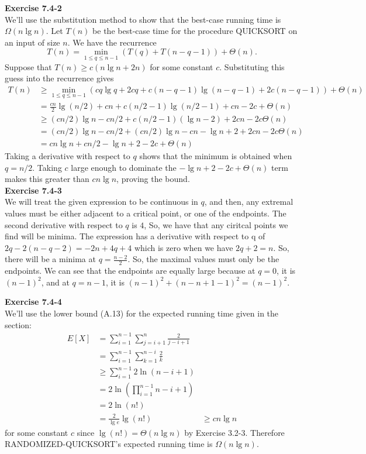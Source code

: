 \documentclass{article}
\begin{document}
\noindent\textbf{Exercise 7.4-2}\\

We'll use the substitution method to show that the best-case running time is $\Omega(n \lg n)$.  Let $T(n)$ be the best-case time for the procedure QUICKSORT on an input of size $n$.  We have the recurrence
\[ T(n) = \min_{1 \leq q \leq n-1} (T(q) + T(n-q-1)) + \Theta(n).\]
Suppose that $T(n) \geq c(n\lg n + 2n)$ for some constant $c$.  Substituting this guess into the recurrence gives
\begin{align*}
T(n) &\geq \min_{1 \leq q \leq n-1} (cq\lg q + 2cq + c(n-q-1)\lg(n-q-1) + 2c(n-q-1)) + \Theta(n) \\
&= \frac{cn}{2}\lg(n/2) + cn + c(n/2 - 1)\lg(n/2 - 1) + cn - 2c+ \Theta(n) \\
&\geq (cn/2)\lg n - cn/2 + c(n/2 - 1)(\lg n - 2) + 2cn - 2c \Theta(n) \\
&= (cn/2)\lg n - cn/2 + (cn/2)\lg n - cn - \lg n + 2 + 2cn - 2c\Theta(n) \\
&=cn\lg n + cn/2 - \lg n + 2 - 2c + \Theta(n)
\end{align*}
Taking a derivative with respect to $q$ shows that the minimum is obtained when $q = n/2$.  Taking $c$ large enough to dominate the $-\lg n + 2 - 2c + \Theta(n)$ term makes this greater than $cn\lg n$, proving the bound. \\

\noindent\textbf{Exercise 7.4-3}\\

We will treat the given expression to be continuous in $q$, and then, any extremal values must be either adjacent to a critical point, or one of the endpoints. The second derivative with respect to $q$ is $4$, So, we have that any ciritcal points we find will be minima. The expression has a derivative with respect to q of $2q - 2 (n-q-2) = -2n + 4q +4$ which is zero when we have $2q+2 =n$. So, there will be a minima at $q= \frac{n-2}{2}$. So, the maximal values must only be the endpoints. We can see that the endpoints are equally large because at $q=0$, it is $(n-1)^2$, and at $q=n-1$, it is $(n-1)^2+ (n-n+1 -1)^2 = (n-1)^2$.


\noindent\textbf{Exercise 7.4-4}\\

We'll use the lower bound (A.13) for the expected running time given in the section:
\begin{align*}
E[X] &= \sum_{i=1}^{n-1}\sum_{j=i+1}^n \frac{2}{j-i+1} \\
&= \sum_{i=1}^{n-1} \sum_{k=1}^{n-i} \frac{2}{k} \\
&\geq \sum_{i=1}^{n-1} 2\ln(n-i+1) \\
&= 2\ln\left(\prod_{i=1}^{n-1} n-i+1\right) \\
&= 2\ln(n!) \\
&= \frac{2}{\lg e} \lg(n!)
&\geq cn \lg n
\end{align*}
for some constant $c$ since $\lg(n!) = \Theta(n \lg n)$ by Exercise 3.2-3. Therefore RANDOMIZED-QUICKSORT's expected running time is $\Omega(n \lg n)$. \\
\end{document}
